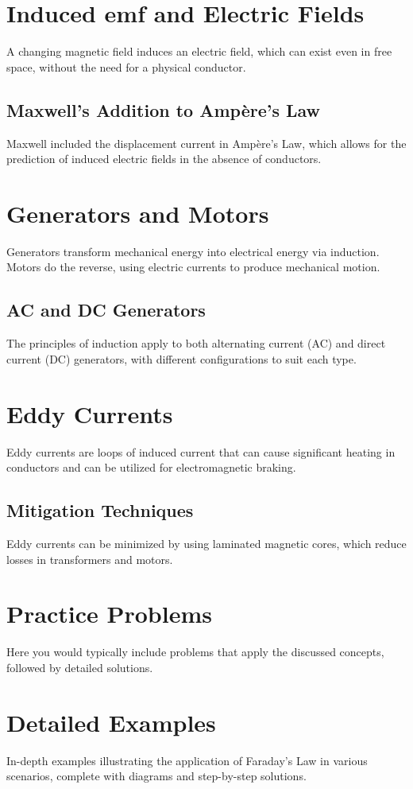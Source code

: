 \documentclass{article}
\begin{document}
\section{Induced emf and Electric Fields}
A changing magnetic field induces an electric field, which can exist even in free space, without the need for a physical conductor.

\subsection{Maxwell's Addition to Ampère's Law}
Maxwell included the displacement current in Ampère's Law, which allows for the prediction of induced electric fields in the absence of conductors.

\section{Generators and Motors}
Generators transform mechanical energy into electrical energy via induction. Motors do the reverse, using electric currents to produce mechanical motion.

\subsection{AC and DC Generators}
The principles of induction apply to both alternating current (AC) and direct current (DC) generators, with different configurations to suit each type.

\section{Eddy Currents}
Eddy currents are loops of induced current that can cause significant heating in conductors and can be utilized for electromagnetic braking.

\subsection{Mitigation Techniques}
Eddy currents can be minimized by using laminated magnetic cores, which reduce losses in transformers and motors.

\section{Practice Problems}
Here you would typically include problems that apply the discussed concepts, followed by detailed solutions.

\section{Detailed Examples}
In-depth examples illustrating the application of Faraday's Law in various scenarios, complete with diagrams and step-by-step solutions.
\end{document}

